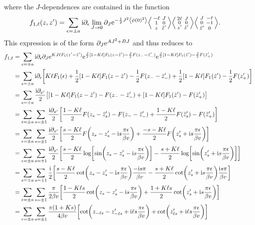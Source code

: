 \documentclass[english, parskip=full]{scrartcl}
\begin{document}
where the $J$-dependences are contained in the function
\begin{align}
f_{1,\ell}(z,z') &= \sum_{\epsilon=\pm a} \i\partial_\epsilon \lim_{J\rightarrow 0} \partial_J \powe{-\frac{1}{2}J^2 \bra*{\phi(0)^2}}  \bra*{\abx{-\ell&J}{1&0}{z&\tilde{z}'}} \bra*{\abx{2\ell&J}{0&0}{z'&\tilde{z}'}} \bra*{\abx{J&-\ell}{0&-1}{\tilde{z}'&0}}.
\end{align}
This expression is of the form $\partial_J\text{e}^{AJ^2 + BJ}$ and thus reduces to
\begin{align}
f_{1,\ell} &= \sum_{\epsilon=\pm a} \i\partial_\epsilon\partial_J \powe{KJ\ell F_1(z'-\tilde{z}')} \powe{\frac{J}{2} \klb*{1-K\ell} F_1(z-\tilde{z}') - \frac{J}{2} F(z_- - \tilde{z}_-')} \powe{\frac{J}{2} \klb*{1-K\ell} F_1(\tilde{z}') - \frac{J}{2} F(\tilde{z}_+')}\\
&= \sum_{\epsilon=\pm a} \i\partial_\epsilon \klb*{K\ell F_1(\epsilon)+\frac{1}{2} \klb*{1-K\ell} F_1(z-\tilde{z}') - \frac{1}{2} F(z_- - \tilde{z}_-') +\frac{1}{2} \klb*{1-K\ell} F_1(\tilde{z}') - \frac{1}{2} F(z_+')}\\
&= \sum_{\epsilon=\pm a} \frac{\i\partial_{x'}}{2} \klb*{\klb*{1-K\ell} F_1(z-\tilde{z}') - F(z_- - \tilde{z}_-') + \klb*{1-K\ell} F_1(\tilde{z}') - F(\tilde{z}_+')}\\
&= \sum_{\epsilon=\pm a} \sum_{s=\pm 1} \frac{\i\partial_{x'}}{2} \klb*{\frac{1-K\ell}{2} F(z_s-\tilde{z}_s') - F(z_- - \tilde{z}_-') + \frac{1-K\ell}{2} F(\tilde{z}_s') - F(\tilde{z}_+')}\\
&= \sum_{\epsilon=\pm a} \sum_{s=\pm 1} \frac{\i\partial_{x'}}{2} \klb*{\frac{s-K\ell}{2} F\kla*{z_s-z_s' - \i s \frac{\pi\epsilon}{\beta v}} + \frac{-s-K\ell}{2} F\kla*{z_s' + \i s\frac{\pi\epsilon}{\beta v}}}\\
&= \sum_{\epsilon=\pm a} \sum_{s=\pm 1} \frac{\i\partial_{x'}}{2} \klb*{\frac{s-K\ell}{2} \log\klb*{\sin\kla*{z_s-z_s' - \i s \frac{\pi\epsilon}{\beta v}}} - \frac{s+K\ell}{2} \log\klb*{\sin\kla*{z_s' + \i s\frac{\pi\epsilon}{\beta v}}}}\\
&= \sum_{\epsilon=\pm a} \sum_{s=\pm 1} \frac{\i}{2} \klb*{\frac{s-K\ell}{2} \cot\kla*{z_s-z_s' - \i s \frac{\pi\epsilon}{\beta v}} \frac{-\i s \pi}{\beta v} - \frac{s+K\ell}{2} \cot\kla*{z_s' + \i s\frac{\pi\epsilon}{\beta v}} \frac{\i s \pi}{\beta v}}\\
&= \sum_{\epsilon=\pm a} \sum_{s=\pm 1} \frac{\pi}{2\beta v} \klb*{\frac{1-K\ell s}{2} \cot\kla*{z_s-z_s' - \i s \frac{\pi\epsilon}{\beta v}} + \frac{1+K\ell s}{2} \cot\kla*{z_s' + \i s\frac{\pi\epsilon}{\beta v}}}\\
&= \sum_{\epsilon=\pm a} \sum_{s=\pm 1} \frac{\pi (1+ Ks)}{4\beta v} \klb*{\cot\kla*{z_{-\ell s}-z_{-\ell s}' + \i \ell s \frac{\pi\epsilon}{\beta v}} + \cot\kla*{z_{\ell s}' + \i \ell s\frac{\pi\epsilon}{\beta v}}}
\end{align}
\end{document}
